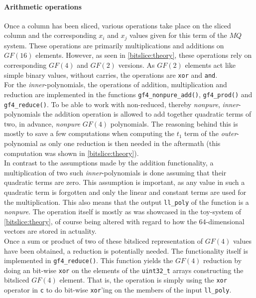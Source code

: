 \paragraph{Arithmetic operations} Once a column has been sliced, various operations take place on the sliced column and the corresponding $x_i$ and $x_j$ values given for this term of the $MQ$ system. These operations are primarily multiplications and additions on $GF(16)$ elements. However, as seen in \cref{bitslice:theory}, these operations rely on corresponding $GF(4)$ and $GF(2)$ versions. As $GF(2)$ elements act like simple binary values, without carries, the operations are \texttt{xor} and \texttt{and}. 
\medskip\\
For the \emph{inner}-polynomials, the operations of addition, multiplication and reduction are implemented in the functions \texttt{gf4\_nonpure\_add()}, \texttt{gf4\_prod()} and \texttt{gf4\_reduce()}. To be able to work with non-reduced, thereby \emph{nonpure}, \emph{inner}-polynomials the addition operation is allowed to add together quadratic terms of two, in advance, \emph{nonpure} $GF(4)$ polynomials. The reasoning behind this is mostly to save a few computations when computing the $t_1$ term of the \emph{outer}-polynomial as only one reduction is then needed in the aftermath (this computation was shown in \cref{bitslice:theory}).
\medskip\\
In contrast to the assumptions made by the addition functionality, a multiplication of two such \emph{inner}-polynomials is done assuming that their quadratic terms are zero. This assumption is important, as any value in such a quadratic term is forgotten and only the linear and constant terms are used for the multiplication. This also means that the output \texttt{ll\_poly} of the function is a \emph{nonpure}. The operation itself is mostly as was showcased in the toy-system of \cref{bitslice:theory}, of course being altered with regard to how the 64-dimensional vectors are stored in actuality.
\medskip\\
Once a sum or product of two of these bitsliced representation of $GF(4)$ values have been obtained, a reduction is potentially needed. The functionality itself is implemented in \texttt{gf4\_reduce()}. This function yields the $GF(4)$ reduction by doing an bit-wise \texttt{xor} on the elements of the \texttt{uint32\_t} arrays constructing the bitsliced $GF(4)$ element. That is, the operation is simply using the \texttt{xor} operator in \texttt{c} to do bit-wise \texttt{xor}'ing on the members of the input \texttt{ll\_poly}.
